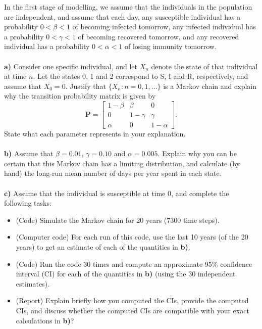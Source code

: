 \documentclass[1p]{article}		%
\begin{document}
In the first stage of modelling, we assume that the individuals in the population
are independent, and assume that each day, any susceptible individual has a 
probability $0 < \beta < 1$ of becoming infected tomorrow, any
infected individual has a probability $0 < \gamma < 1$ of becoming recovered tomorrow, and
any recovered individual has a probability $0 < \alpha < 1$ of losing immunity tomorrow.\\\\
\textbf{a)}
Consider one specific individual, and let $X_n$ denote the state of that individual 
at time $n$. Let the states 0, 1 and 2
correspond to S, I and R, respectively, and assume that $X_0 = 0$.
Justify that $\{X_n: n = 0,1, \ldots\}$ is a Markov chain and explain why the transition
probability matrix is given by
\[
  \mathbf{P} = \begin{bmatrix}
    1-\beta & \beta    & 0 \\
    0       & 1-\gamma & \gamma \\
    \alpha       &   0      & 1-\alpha
  \end{bmatrix}.
\]
State what each parameter represents in your explanation.\\\\
\textbf{b)}
Assume that $\beta = 0.01$, $\gamma = 0.10$ and $\alpha = 0.005$. Explain why you can be
certain that this Markov chain has a limiting distribution, and
calculate (by hand) the long-run mean number of days per year spent in each state.\\\\
\textbf{c)}
Assume that the individual is susceptible at time 0, and complete the following tasks:
\begin{itemize}
  \item
    (Code) Simulate the Markov chain for 20 years (7300 time steps). 
  \item (Computer code) For each run of this code, use the last 10 years (of the 20 years) to get an estimate of
  each of the quantities in \textbf{b)}.
  \item
  (Code) Run the code 30 times and compute an approximate 95\% confidence interval (CI)
for each of the quantities in \textbf{b)} (using the 30 independent estimates).
  \item (Report) Explain briefly how you computed the CIs, provide the computed CIs,
  and discuss whether the computed CIs are compatible with your exact 
calculations in \textbf{b)}?
\end{itemize}
\vspace{0.1cm}
\end{document}
